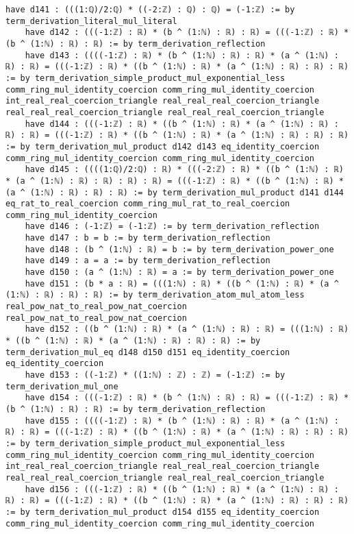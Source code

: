 \documentclass{article}
\begin{document}
\begin{tcolorbox}[colback=white!10, width=\linewidth]
\begin{lstlisting}[language=Lean4]
    have d141 : (((1:ℚ)/2:ℚ) * ((-2:ℤ) : ℚ) : ℚ) = (-1:ℤ) := by term_derivation_literal_mul_literal
    have d142 : (((-1:ℤ) : ℝ) * (b ^ (1:ℕ) : ℝ) : ℝ) = (((-1:ℤ) : ℝ) * (b ^ (1:ℕ) : ℝ) : ℝ) := by term_derivation_reflection
    have d143 : ((((-1:ℤ) : ℝ) * (b ^ (1:ℕ) : ℝ) : ℝ) * (a ^ (1:ℕ) : ℝ) : ℝ) = (((-1:ℤ) : ℝ) * ((b ^ (1:ℕ) : ℝ) * (a ^ (1:ℕ) : ℝ) : ℝ) : ℝ) := by term_derivation_simple_product_mul_exponential_less comm_ring_mul_identity_coercion comm_ring_mul_identity_coercion int_real_real_coercion_triangle real_real_real_coercion_triangle real_real_real_coercion_triangle real_real_real_coercion_triangle
    have d144 : (((-1:ℤ) : ℝ) * ((b ^ (1:ℕ) : ℝ) * (a ^ (1:ℕ) : ℝ) : ℝ) : ℝ) = (((-1:ℤ) : ℝ) * ((b ^ (1:ℕ) : ℝ) * (a ^ (1:ℕ) : ℝ) : ℝ) : ℝ) := by term_derivation_mul_product d142 d143 eq_identity_coercion comm_ring_mul_identity_coercion comm_ring_mul_identity_coercion
    have d145 : ((((1:ℚ)/2:ℚ) : ℝ) * (((-2:ℤ) : ℝ) * ((b ^ (1:ℕ) : ℝ) * (a ^ (1:ℕ) : ℝ) : ℝ) : ℝ) : ℝ) = (((-1:ℤ) : ℝ) * ((b ^ (1:ℕ) : ℝ) * (a ^ (1:ℕ) : ℝ) : ℝ) : ℝ) := by term_derivation_mul_product d141 d144 eq_rat_to_real_coercion comm_ring_mul_rat_to_real_coercion comm_ring_mul_identity_coercion
    have d146 : (-1:ℤ) = (-1:ℤ) := by term_derivation_reflection
    have d147 : b = b := by term_derivation_reflection
    have d148 : (b ^ (1:ℕ) : ℝ) = b := by term_derivation_power_one
    have d149 : a = a := by term_derivation_reflection
    have d150 : (a ^ (1:ℕ) : ℝ) = a := by term_derivation_power_one
    have d151 : (b * a : ℝ) = (((1:ℕ) : ℝ) * ((b ^ (1:ℕ) : ℝ) * (a ^ (1:ℕ) : ℝ) : ℝ) : ℝ) := by term_derivation_atom_mul_atom_less real_pow_nat_to_real_pow_nat_coercion real_pow_nat_to_real_pow_nat_coercion
    have d152 : ((b ^ (1:ℕ) : ℝ) * (a ^ (1:ℕ) : ℝ) : ℝ) = (((1:ℕ) : ℝ) * ((b ^ (1:ℕ) : ℝ) * (a ^ (1:ℕ) : ℝ) : ℝ) : ℝ) := by term_derivation_mul_eq d148 d150 d151 eq_identity_coercion eq_identity_coercion
    have d153 : ((-1:ℤ) * ((1:ℕ) : ℤ) : ℤ) = (-1:ℤ) := by term_derivation_mul_one
    have d154 : (((-1:ℤ) : ℝ) * (b ^ (1:ℕ) : ℝ) : ℝ) = (((-1:ℤ) : ℝ) * (b ^ (1:ℕ) : ℝ) : ℝ) := by term_derivation_reflection
    have d155 : ((((-1:ℤ) : ℝ) * (b ^ (1:ℕ) : ℝ) : ℝ) * (a ^ (1:ℕ) : ℝ) : ℝ) = (((-1:ℤ) : ℝ) * ((b ^ (1:ℕ) : ℝ) * (a ^ (1:ℕ) : ℝ) : ℝ) : ℝ) := by term_derivation_simple_product_mul_exponential_less comm_ring_mul_identity_coercion comm_ring_mul_identity_coercion int_real_real_coercion_triangle real_real_real_coercion_triangle real_real_real_coercion_triangle real_real_real_coercion_triangle
    have d156 : (((-1:ℤ) : ℝ) * ((b ^ (1:ℕ) : ℝ) * (a ^ (1:ℕ) : ℝ) : ℝ) : ℝ) = (((-1:ℤ) : ℝ) * ((b ^ (1:ℕ) : ℝ) * (a ^ (1:ℕ) : ℝ) : ℝ) : ℝ) := by term_derivation_mul_product d154 d155 eq_identity_coercion comm_ring_mul_identity_coercion comm_ring_mul_identity_coercion

\end{lstlisting}
\end{tcolorbox}
\end{document}
